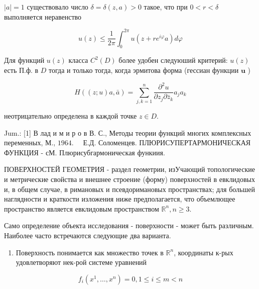 \documentclass[10pt]{article}
\begin{document}
$|a|=1$ существовало число $\delta=\delta(z, a)>0$ такое, что при $0<r<\delta$ выполняется неравенство



\[

u(z) \leqslant \frac{1}{2 \pi} \int_{0}^{2 \pi} u\left(z+r e^{i \varphi} a\right) d \varphi

\]



Для функций $u(z)$ класса $C^{2}(D)$ более удобен следуюший критерий: $u(z)$ есть П.ф. в $D$ тогда и только тогда, когда эрмитова форма (гессиан функции $\boldsymbol{u}$ )



\[

H((z ; u) a, \bar{a})=\sum_{j, k=1}^{n} \frac{\partial^{2} u}{\partial z_{j} \partial \bar{z}_{k}} a_{j} a_{k}

\]



неотрицательно определена в каждой точке $z \in D$.



Jum.: [1] В лад и м и р о в В. С., Методы теории функций многих комплексных переменных, М., $1964 . \quad$ Е.Д. Соломенцев. ПЛЮРИСУПЕРТАРМОНИЧЕСКАЯ ФУНКЦИЯ - сМ. Плюрисубгармоническая функиия.



ПОВЕРХНОСТЕЙ ГЕОМЕТРИЯ - раздел геометрии, изУчающий топологические и метрические свойства и внешнее строение (форму) поверхностей в евклидовых и, в общем случае, в римановых и псевдоримановых пространствах; для большей наглядности и краткости изложения ниже предполагается, что объемлющее пространство является евклидовым пространством $\mathbb{R}^{n}, n \geqslant 3$.



Само определение объекта исследования - поверхности - может быть различным. Наиболее часто встречаются следующие два варианта.



\begin{enumerate}

  \item Поверхность понимается как множество точек в $\mathbb{R}^{n}$, координаты к-рых удовлетворяют нек-рой системе уравнений

\end{enumerate}



\[

f_{i}\left(x^{1}, \ldots, x^{n}\right)=0,1 \leqslant i \leqslant m<n

\]
\end{document}
